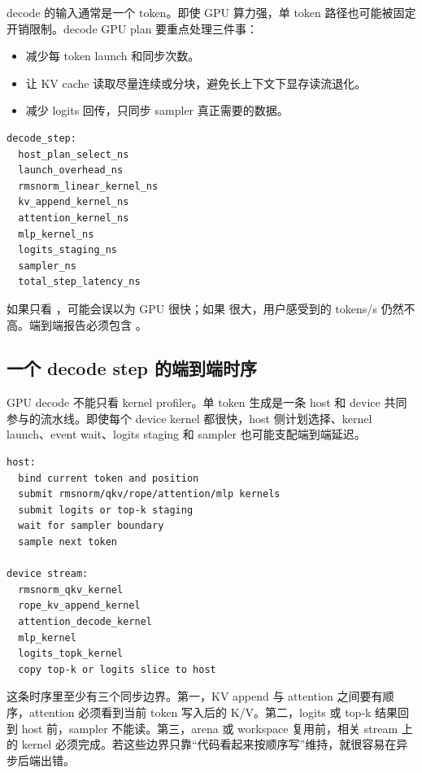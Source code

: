 decode 的输入通常是一个 token。即使 GPU 算力强，单 token 路径也可能被固定开销限制。decode GPU plan 要重点处理三件事：

\begin{itemize}
  \item 减少每 token launch 和同步次数。
  \item 让 KV cache 读取尽量连续或分块，避免长上下文下显存读流退化。
  \item 减少 logits 回传，只同步 sampler 真正需要的数据。
\end{itemize}

\begin{lstlisting}[numbers=none,caption={decode GPU profiler 应拆分的事件}]
decode_step:
  host_plan_select_ns
  launch_overhead_ns
  rmsnorm_linear_kernel_ns
  kv_append_kernel_ns
  attention_kernel_ns
  mlp_kernel_ns
  logits_staging_ns
  sampler_ns
  total_step_latency_ns
\end{lstlisting}

如果只看 ，可能会误以为 GPU 很快；如果  很大，用户感受到的 tokens/s 仍然不高。端到端报告必须包含 。

\subsection{一个 decode step 的端到端时序}

GPU decode 不能只看 kernel profiler。单 token 生成是一条 host 和 device 共同参与的流水线。即使每个 device kernel 都很快，host 侧计划选择、kernel launch、event wait、logits staging 和 sampler 也可能支配端到端延迟。

\begin{lstlisting}[numbers=none,caption={GPU decode step 的最小时序}]
host:
  bind current token and position
  submit rmsnorm/qkv/rope/attention/mlp kernels
  submit logits or top-k staging
  wait for sampler boundary
  sample next token

device stream:
  rmsnorm_qkv_kernel
  rope_kv_append_kernel
  attention_decode_kernel
  mlp_kernel
  logits_topk_kernel
  copy top-k or logits slice to host
\end{lstlisting}

这条时序里至少有三个同步边界。第一，KV append 与 attention 之间要有顺序，attention 必须看到当前 token 写入后的 K/V。第二，logits 或 top-k 结果回到 host 前，sampler 不能读。第三，arena 或 workspace 复用前，相关 stream 上的 kernel 必须完成。若这些边界只靠“代码看起来按顺序写”维持，就很容易在异步后端出错。


